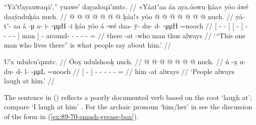 \ex\label{ex:89-114-this-guy-they-say}%
%
\begingl
	\glpreamble	“Yā′t!ayauwaqā′,” yuawe′ daỵadoqā′nutc. //
	\glpreamble	«\!Yáatʼaa áa aya.óowu ḵáa\!» yóo áwé daaÿaduḵáa nuch. //
	\gla	{}  @ {} @ {}
			{} {}  @ {} {}
				 @ {} @ {} @ {} @ {} {} ḵáa!» {}
		yóo  @ {}
		 @ {} @ {} @ {} @ {} @ {} @ \•nuch. //
	\glb	{} yá- tʼ- aa
			{} {} á -μ {}
				a- i-  -μμH -i {} ḵáa {}
		yóo á -wé
		daa- ÿ- du- d-  -μμH =nooch //
	\glc	{}[ - - 
			{}[ {}[  - {}]
				- -  - - {}] man {}]
		  -
		around- - - -  - = //
	\gld	{}  {} {}
			{} {} there -at {}
				 {} {} {} -who {} man {}
		thus  {}
		 {} {} {} {} {} \•always //
	\glft	‘“This one man who lives there” is what people say about him.’
		//
\endgl
\xe


\ex\label{ex:89-115-laugh-at-him}%
%
\begingl
	\glpreamble	U′x udułcu′qnutc. //
	\glpreamble	Óox̱ udulshooḵ nuch. //
	\gla	{}  @ {} {}
		 @ {} @ {} @ {} @ {} @ {} @ \•nuch. //
	\glb	{} ú -x̱ {}
		u- du- d- l-  -μμL =nooch //
	\glc	{}[  - {}]
		- - - -  - = //
	\gld	{} him -at {}
		 {} {} {} {} {} \•always //
	\glft	‘People always laugh at him.’
		//
\endgl
\xe

The sentence in (\lastx) reflects a poorly documented verb based on the root  ‘laugh at’; compare  ‘I laugh at him’ \parencite[10/117]{leer:1973}.
For the archaic pronoun  ‘him/her’ in  see the discussion of the form  in (\ref{ex:89-70-smash-grease-box}).

